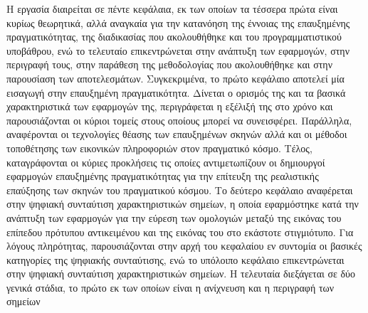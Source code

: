 Η εργασία διαιρείται σε πέντε κεφάλαια, εκ των οποίων τα τέσσερα πρώτα είναι κυρίως θεωρητικά, αλλά αναγκαία για την κατανόηση της έννοιας της επαυξημένης πραγματικότητας, της διαδικασίας που ακολουθήθηκε και του προγραμματιστικού υποβάθρου, ενώ το τελευταίο επικεντρώνεται στην ανάπτυξη των εφαρμογών, στην περιγραφή τους, στην παράθεση της μεθοδολογίας που ακολουθήθηκε και στην παρουσίαση των αποτελεσμάτων.
Συγκεκριμένα, το πρώτο κεφάλαιο αποτελεί μία εισαγωγή στην επαυξημένη πραγματικότητα.
Δίνεται ο ορισμός της και τα βασικά χαρακτηριστικά των εφαρμογών της, περιγράφεται η εξέλιξή της στο χρόνο και παρουσιάζονται οι κύριοι τομείς στους οποίους μπορεί να συνεισφέρει. Παράλληλα, αναφέρονται οι τεχνολογίες θέασης των επαυξημένων σκηνών αλλά και οι μέθοδοι τοποθέτησης των εικονικών πληροφοριών στον πραγματικό κόσμο. Τέλος, καταγράφονται οι κύριες προκλήσεις τις οποίες αντιμετωπίζουν οι δημιουργοί εφαρμογών επαυξημένης πραγματικότητας για την επίτευξη της ρεαλιστικής επαύξησης των σκηνών του πραγματικού κόσμου.
Το δεύτερο κεφάλαιο αναφέρεται στην ψηφιακή συνταύτιση χαρακτηριστικών σημείων, η οποία εφαρμόστηκε κατά την ανάπτυξη των εφαρμογών για την εύρεση των ομολογιών μεταξύ της εικόνας του επίπεδου πρότυπου αντικειμένου και της εικόνας του στο εκάστοτε στιγμιότυπο. Για λόγους πληρότητας, παρουσιάζονται στην αρχή του κεφαλαίου εν συντομία οι βασικές κατηγορίες της ψηφιακής συνταύτισης, ενώ το υπόλοιπο κεφάλαιο επικεντρώνεται στην ψηφιακή συνταύτιση χαρακτηριστικών σημείων. Η τελευταία διεξάγεται σε δύο γενικά στάδια, το πρώτο εκ των οποίων είναι η ανίχνευση και η περιγραφή των σημείων

